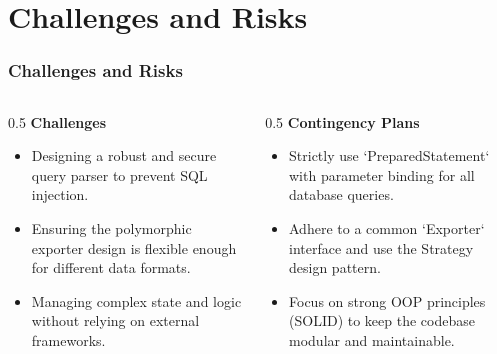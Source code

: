 \documentclass{beamer}
\begin{document}
\section{Challenges and Risks}
\begin{frame}
    \frametitle{Challenges and Risks}
    \begin{columns}[c] %
        \begin{column}{0.5\textwidth}
            \textbf{Challenges}
            \begin{itemize}
                \item Designing a robust and secure query parser to prevent SQL injection.
                \pause
                \item Ensuring the polymorphic exporter design is flexible enough for different data formats.
                \pause
                \item Managing complex state and logic without relying on external frameworks.
            \end{itemize}
        \end{column}
        \begin{column}{0.5\textwidth}
            \textbf{Contingency Plans}
            \begin{itemize}
                \item Strictly use `PreparedStatement` with parameter binding for all database queries.
                \pause
                \item Adhere to a common `Exporter` interface and use the Strategy design pattern.
                \pause
                \item Focus on strong OOP principles (SOLID) to keep the codebase modular and maintainable.
            \end{itemize}
        \end{column}
    \end{columns}
\end{frame}

\end{document}
